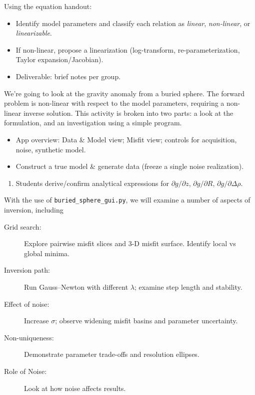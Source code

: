 Using the equation handout:
\begin{itemize}
  \item Identify model parameters and classify each relation as \emph{linear}, \emph{non-linear}, or \emph{linearizable}.
  \item If non-linear, propose a linearization (log-transform, re-parameterization, Taylor expansion/Jacobian).
  \item Deliverable: brief notes per group.
\end{itemize}



We're going to look at the gravity anomaly from a buried sphere.  The forward problem is non-linear with respect to the model parameters, requiring a non-linear inverse solution.  This activity is broken into two parts: a look at the formulation, and an investigation using a simple program.
\begin{itemize}
  \item App overview: Data \& Model view; Misfit view; controls for acquisition, noise, synthetic model.
  \item Construct a true model \& generate data (freeze a single noise realization).
\end{itemize}

\begin{enumerate}
  \item Students derive/confirm analytical expressions for
    $\partial g/\partial z$,
    $\partial g/\partial R$,
    $\partial g/\partial \Delta\rho$.
\end{enumerate}


With the use of \verb+buried_sphere_gui.py+, we will examine a number of aspects of inversion, including
\begin{description}
  \item [Grid search:] Explore pairwise misfit slices and 3-D misfit surface. Identify local vs global minima.
  \item [Inversion path:] Run Gauss--Newton with different $\lambda$; examine step length and stability.
  \item [Effect of noise:] Increase $\sigma$; observe widening misfit basins and parameter uncertainty.
  \item [Non-uniqueness:] Demonstrate parameter trade-offs and resolution ellipses.
  \item [Role of Noise:] Look at how noise affects results.
\end{description}

